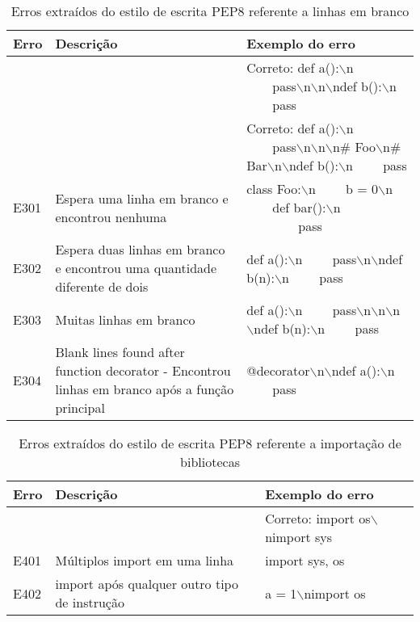 	\begin{table}
		\scriptsize
		\begin{tabularx}{\linewidth}{ |l|X|X| }
			\hline
			\textbf{Erro}
			& \textbf{Descrição}
			& \textbf{Exemplo do erro} \\
			\hline
			
			& 
			& Correto: def a():$\backslash$n \ \ \ \ pass$\backslash$n$\backslash$n$\backslash$ndef b():$\backslash$n \ \ \ \ pass \\ 
			\hline
			
			& 
			& Correto: def a():$\backslash$n \ \ \ \ pass$\backslash$n$\backslash$n$\backslash$n\# Foo$\backslash$n\# Bar$\backslash$n$\backslash$ndef b():$\backslash$n \ \ \ \ pass \\ 
			\hline
			E301 
			& Espera uma linha em branco e encontrou nenhuma 
			& class Foo:$\backslash$n \ \ \ \ b = 0$\backslash$n \ \ \ \ def bar():$\backslash$n \ \ \ \  \ \ \ \ pass \\ 
			\hline
			E302 
			& Espera duas linhas em branco e encontrou uma quantidade diferente de dois 
			& def a():$\backslash$n \ \ \ \ pass$\backslash$n$\backslash$ndef b(n):$\backslash$n \ \ \ \ pass \\ 
			\hline
			E303 
			& Muitas linhas em branco 
			& def a():$\backslash$n \ \ \ \ pass$\backslash$n$\backslash$n$\backslash$n$\backslash$ndef b(n):$\backslash$n \ \ \ \ pass \\ 
			\hline
			E304 
			& Blank lines found after function decorator - Encontrou linhas em branco após a função principal 
			& @decorator$\backslash$n$\backslash$ndef a():$\backslash$n \ \ \ \ pass \\ 
			\hline
		\end{tabularx}
		\caption{Erros extraídos do estilo de escrita PEP8 referente a linhas em branco}
		\label{tab:pep8E300}
	\end{table}

	\begin{table}
		\scriptsize
		\begin{tabularx}{\linewidth}{ |l|X|X| }
			\hline
			\textbf{Erro}
			& \textbf{Descrição}
			& \textbf{Exemplo do erro} \\
			\hline
			
			& 
			& Correto: import os$\backslash$nimport sys \\ 
			\hline
			E401 
			& Múltiplos import em uma linha 
			& import sys, os \\ 
			\hline
			E402
			& import após qualquer outro tipo de instrução
			& a = 1$\backslash$nimport os \\
			\hline
		\end{tabularx}
		\caption{Erros extraídos do estilo de escrita PEP8 referente a importação de bibliotecas}
		\label{tab:pep8E400}
	\end{table}

